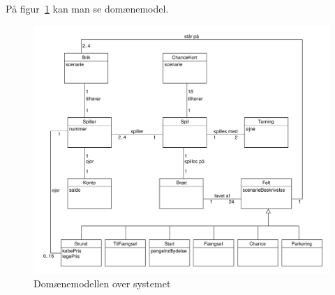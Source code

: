 \documentclass[class=article, crop=false]{standalone}
\begin{document}
    På figur~\ref{fig:domain_model} kan man se domænemodel.

            \begin{figure}[H]
                \centering

                \includegraphics[scale=0.3]{diagrams/domain_model.pdf}
                \caption{Domænemodellen over systemet}\label{fig:domain_model}
            \end{figure}
\end{document}
